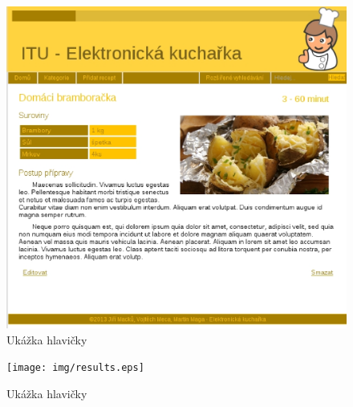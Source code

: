 \documentclass[12pt,a4paper,titlepage,final]{article}
\begin{document}
\begin{figure}

\begin{center}

\includegraphics[scale=0.7]{img/recept.eps} 
\caption{Ukážka hlavičky}
\label{koncept}

\end{center}

\end{figure}


\begin{figure}

\begin{center}

\texttt{[image: img/results.eps]} 
\caption{Ukážka hlavičky}
\label{koncept}

\end{center}

\end{figure}
\end{document}
